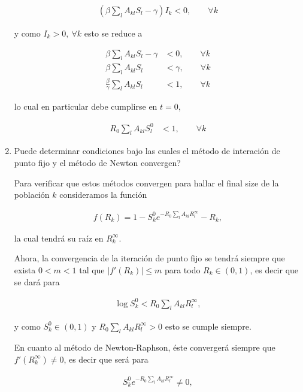 \documentclass[answers]{exam}
\begin{document}
\begin{questions}
\begin{enumerate}
\begin{solution}
\begin{align*}
    \left(\beta\sum_lA_{kl}S_l - \gamma\right)I_k < 0, \qquad \forall k
\end{align*}

y como $I_k > 0, \ \forall k$ esto se reduce a

\begin{align*}
    \beta\sum_lA_{kl}S_l - \gamma &< 0, \qquad \forall k\\
    \beta\sum_lA_{kl}S_l &< \gamma, \qquad \forall k\\
    \frac{\beta}{\gamma}\sum_lA_{kl}S_l &< 1, \qquad \forall k
\end{align*}

lo cual en particular debe cumplirse en $t = 0$,

\begin{align*}
    R_0\sum_lA_{kl}S_l^0 &< 1, \qquad \forall k
\end{align*}
\end{solution}

\item Puede determinar condiciones bajo las cuales el método de interaci\'on de punto fijo y el m\'etodo de Newton convergen?

\begin{solution}
Para verificar que estos métodos convergen para hallar el final size de la población $k$ consideramos la función

\begin{align*}
    f(R_k) = 1 - S_k^0e^{-R_0\sum_lA_{kl}R_l^\infty} - R_k,
\end{align*}

la cual tendrá su raíz en $R_k^\infty$.

Ahora, la convergencia de la iteración de punto fijo se tendrá siempre que exista $0 < m < 1$ tal que $|f'(R_k)| \leq m$ para todo $R_k \in (0,1)$, es decir que se dará para

\begin{align*}
    \log{S_k^0} < R_0\sum_lA_{kl}R_l^\infty,
\end{align*}

y como $S_k^0 \in (0,1)$ y $R_0\sum_lA_{kl}R_l^\infty > 0$ esto se cumple siempre.

En cuanto al método de Newton-Raphson, éste convergerá siempre que $f'(R_k^\infty) \neq 0$, es decir que será para

\begin{align*}
    S_k^0e^{-R_0\sum_lA_{kl}R_l^\infty} \neq 0,
\end{align*}


\end{solution}
\end{enumerate}
\end{questions}
\end{document}
